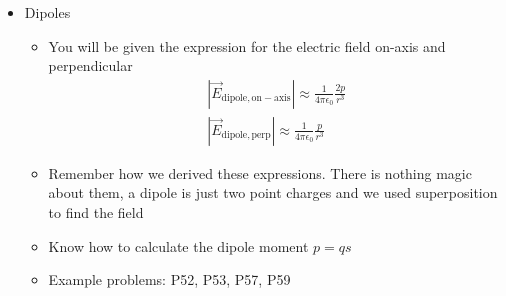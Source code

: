 \documentclass{article}
\begin{document}
\begin{itemize}

	\item Dipoles
	\begin{itemize}
		\item You will be given the expression for the electric field on-axis and perpendicular
		\begin{eqnarray*}
		|\vec{E}_\mathrm{dipole,on-axis}| \approx \frac{1}{4\pi\epsilon_0}\frac{2p}{r^3}\\
		|\vec{E}_\mathrm{dipole,perp}| \approx \frac{1}{4\pi\epsilon_0}\frac{p}{r^3}
		\end{eqnarray*}
		\item Remember how we derived these expressions. There is nothing magic about them, a dipole is just two point charges and we used superposition to find the field
		\item Know how to calculate the dipole moment $p=qs$
		\item Example problems: P52, P53, P57, P59
	\end{itemize}
\end{itemize}
\end{document}
